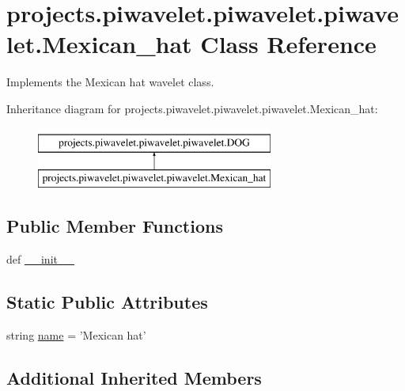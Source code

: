 \hypertarget{classprojects_1_1piwavelet_1_1piwavelet_1_1piwavelet_1_1Mexican__hat}{\section{projects.\-piwavelet.\-piwavelet.\-piwavelet.\-Mexican\-\_\-hat Class Reference}
\label{classprojects_1_1piwavelet_1_1piwavelet_1_1piwavelet_1_1Mexican__hat}
}


Implements the Mexican hat wavelet class.  


Inheritance diagram for projects.\-piwavelet.\-piwavelet.\-piwavelet.\-Mexican\-\_\-hat\-:\begin{figure}[H]
\begin{center}
\leavevmode
\includegraphics[height=2.000000cm]{classprojects_1_1piwavelet_1_1piwavelet_1_1piwavelet_1_1Mexican__hat}
\end{center}
\end{figure}
\subsection*{Public Member Functions}
\begin{DoxyCompactItemize}
\item 
def \hyperlink{classprojects_1_1piwavelet_1_1piwavelet_1_1piwavelet_1_1Mexican__hat_ada43e803133f4129b08c815835d4eddd}{\-\_\-\-\_\-init\-\_\-\-\_\-}
\end{DoxyCompactItemize}
\subsection*{Static Public Attributes}
\begin{DoxyCompactItemize}
\item 
string \hyperlink{classprojects_1_1piwavelet_1_1piwavelet_1_1piwavelet_1_1Mexican__hat_a7f631c3c1a05bf41710c77fd94db9a27}{name} = 'Mexican hat'
\end{DoxyCompactItemize}
\subsection*{Additional Inherited Members}


